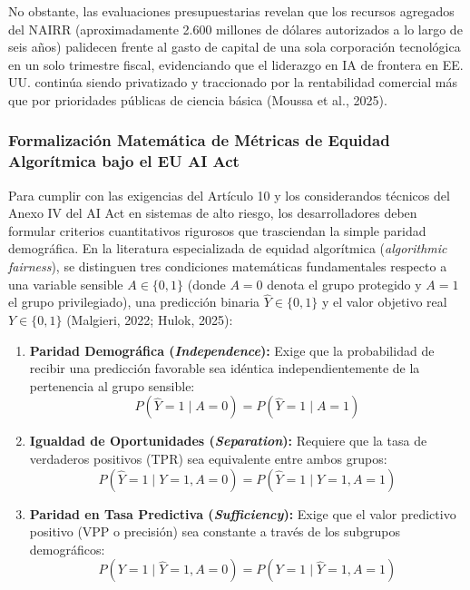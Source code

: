 No obstante, las evaluaciones presupuestarias revelan que los recursos agregados del NAIRR (aproximadamente 2.600 millones de dólares autorizados a lo largo de seis años) palidecen frente al gasto de capital de una sola corporación tecnológica en un solo trimestre fiscal, evidenciando que el liderazgo en IA de frontera en EE. UU. continúa siendo privatizado y traccionado por la rentabilidad comercial más que por prioridades públicas de ciencia básica (Moussa et al., 2025).

\subsubsection{Formalización Matemática de Métricas de Equidad Algorítmica bajo el EU AI Act}

Para cumplir con las exigencias del Artículo 10 y los considerandos técnicos del Anexo IV del AI Act en sistemas de alto riesgo, los desarrolladores deben formular criterios cuantitativos rigurosos que trasciendan la simple paridad demográfica. En la literatura especializada de equidad algorítmica (\textit{algorithmic fairness}), se distinguen tres condiciones matemáticas fundamentales respecto a una variable sensible $A \in \{0, 1\}$ (donde $A=0$ denota el grupo protegido y $A=1$ el grupo privilegiado), una predicción binaria $\hat{Y} \in \{0, 1\}$ y el valor objetivo real $Y \in \{0, 1\}$ (Malgieri, 2022; Hulok, 2025):

\begin{enumerate}[label=\alph*), leftmargin=2em]
    \item \textbf{Paridad Demográfica (\textit{Independence}):} Exige que la probabilidad de recibir una predicción favorable sea idéntica independientemente de la pertenencia al grupo sensible:
    \begin{equation}
        P(\hat{Y} = 1 \mid A = 0) = P(\hat{Y} = 1 \mid A = 1)
        \label{eq:paridad_demografica}
    \end{equation}
    \item \textbf{Igualdad de Oportunidades (\textit{Separation}):} Requiere que la tasa de verdaderos positivos (TPR) sea equivalente entre ambos grupos:
    \begin{equation}
        P(\hat{Y} = 1 \mid Y = 1, A = 0) = P(\hat{Y} = 1 \mid Y = 1, A = 1)
        \label{eq:igualdad_oportunidades}
    \end{equation}
    \item \textbf{Paridad en Tasa Predictiva (\textit{Sufficiency}):} Exige que el valor predictivo positivo (VPP o precisión) sea constante a través de los subgrupos demográficos:
    \begin{equation}
        P(Y = 1 \mid \hat{Y} = 1, A = 0) = P(Y = 1 \mid \hat{Y} = 1, A = 1)
        \label{eq:paridad_predictiva}
    \end{equation}
\end{enumerate}


